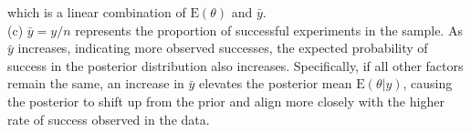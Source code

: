 \documentclass[UTF8]{ctexart}
\begin{document}
which is a linear combination of $\text{E} (\theta)$ and $\bar{y}$.\\
(c)  $\bar{y} = y / n$ represents the proportion of successful experiments in the sample.
As $\bar{y}$ increases, indicating more observed successes, 
the expected probability of success in the posterior distribution also increases. 
Specifically, if all other factors remain the same, an increase in $\bar{y}$ elevates the posterior mean $\text{E}(\theta|y)$, 
causing the posterior to shift up from the prior and align more closely with the higher rate of success observed in the data.
\end{document}
